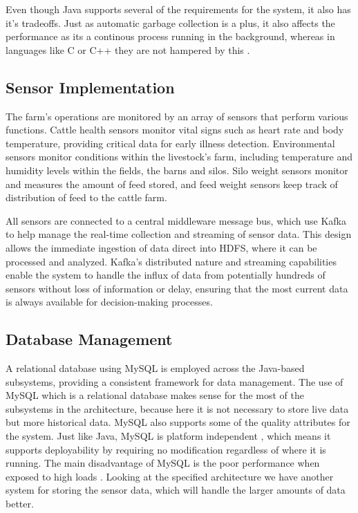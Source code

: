 \documentclass[conference]{IEEEtran}
\begin{document}
Even though Java supports several of the requirements for the system, it also has it's tradeoffs. Just as automatic garbage collection is a plus, it also affects the performance as its a continous process running in the background, whereas in languages like C or C++ they are not hampered by this \cite{Team_2022}.

\subsection{Sensor Implementation}
The farm’s operations are monitored by an array of sensors that perform various functions. Cattle health sensors monitor vital signs such as heart rate and body temperature, providing critical data for early illness detection. Environmental sensors monitor conditions within the livestock's farm, including temperature and humidity levels within the fields, the barns and silos. Silo weight sensors monitor and measures the amount of feed stored, and feed weight sensors keep track of distribution of feed to the cattle farm.

All sensors are connected to a central middleware message bus, which use Kafka to help manage the real-time collection and streaming of sensor data. This design allows the immediate ingestion of data direct into HDFS, where it can be processed and analyzed. Kafka’s distributed nature and streaming capabilities enable the system to handle the influx of data from potentially hundreds of sensors without loss of information or delay, ensuring that the most current data is always available for decision-making processes.

\subsection{Database Management}
A relational database using MySQL is employed across the Java-based subsystems, providing a consistent framework for data management.
The use of MySQL which is a relational database makes sense for the most of the subsystems in the architecture, because here it is not necessary to store live data but more historical data. MySQL also supports some of the quality attributes for the system. Just like Java, MySQL is platform independent \cite{Blue}, which means it supports deployability by requiring no modification regardless of where it is running.
The main disadvantage of MySQL is the poor performance when exposed to high loads \cite{Blue}. Looking at the specified architecture we have another system for storing the sensor data, which will handle the larger amounts of data better.
\end{document}
